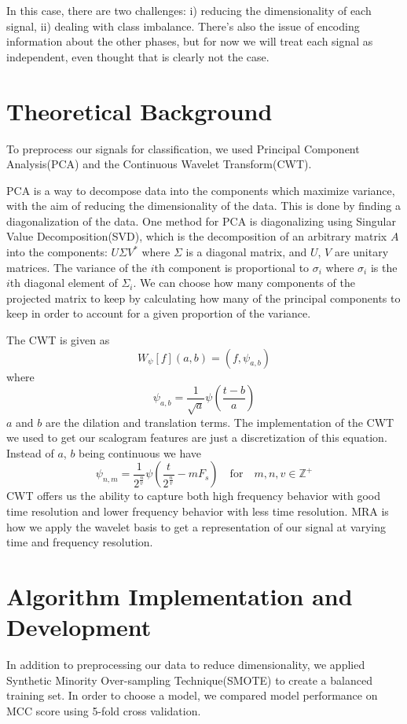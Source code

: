 \documentclass{article}
\begin{document}
In this case, there are two challenges: i) reducing the dimensionality of each
signal, ii) dealing with class imbalance. There's also the issue of encoding
information about the other phases, but for now we will treat each signal as
independent, even thought that is clearly not the case.

\section{Theoretical Background}
To preprocess our signals for classification, we used Principal Component
Analysis(PCA) and the Continuous Wavelet Transform(CWT).

PCA is a way to decompose data into the components which maximize variance, with
the aim of reducing the dimensionality of the data. This is done by finding a
diagonalization of the data. One method for PCA is diagonalizing using Singular
Value Decomposition(SVD), which is the decomposition of an arbitrary matrix $A$
into the components: $U \Sigma V^*$ where $\Sigma$ is a diagonal matrix, and
$U$, $V$ are unitary matrices. The variance of the $i$th component is
proportional to $\sigma_i$ where $\sigma_i$ is the $i$th diagonal element of
$\Sigma_i$. We can choose how many components of the projected matrix to keep by
calculating how many of the principal components to keep in order to account for
a given proportion of the variance.

The CWT is given as
$$
W_\psi[f](a, b) = (f, \psi_{a, b})
$$
where
$$
\psi_{a, b} = \frac{1}{\sqrt{a}}\psi(\frac{t - b}{a})
$$
$a$ and $b$ are the dilation and translation terms. The implementation of the
CWT we used to get our scalogram features are just a discretization of this
equation. Instead of $a$, $b$ being continuous we have
$$
\psi_{n, m} = \frac{1}{2^\frac{n}{v}}\psi(\frac{t}{2^\frac{n}{v}} - m F_s) \quad \mathrm{for}\quad m, n, v \in \mathbb{Z^+}
$$
CWT offers us the ability to capture both high frequency behavior with good time
resolution and lower frequency behavior with less time resolution. MRA is how we
apply the wavelet basis to get a representation of our signal at varying time
and frequency resolution.


\section{Algorithm Implementation and Development}
In addition to preprocessing our data to reduce dimensionality, we applied
Synthetic Minority Over-sampling Technique(SMOTE) to create a balanced training
set. In order to choose a model, we compared model performance on MCC score
using 5-fold cross validation.
\end{document}
